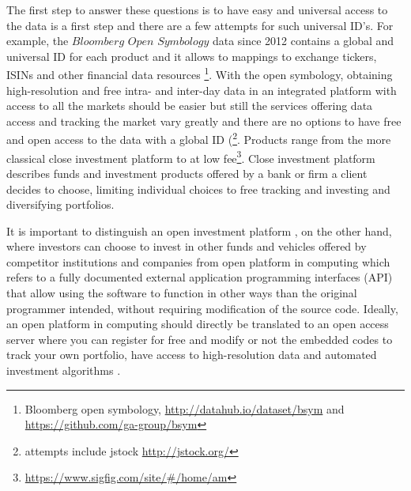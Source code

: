 \documentclass[english,12pt]{article}
\begin{document}
The first step to answer these questions is to have easy and universal access to the data is a first step and there are a few attempts for such universal ID's. For example, the $Bloomberg$ $Open$ $Symbology$ data since 2012 contains a global and universal ID for each product and it allows to mappings to exchange tickers, ISINs and other financial data resources \footnote{Bloomberg open symbology, \url{http://datahub.io/dataset/bsym} and \url{https://github.com/ga-group/bsym}}. With the open symbology, obtaining high-resolution and free intra- and inter-day data in an integrated platform with access to all the markets should be easier but still the services offering data access and tracking the
market vary greatly and there are no options to have free and open access to the data with a global ID (\footnote{attempts include jstock \url{http://jstock.org/}}. Products range from the more classical close investment platform  to  at low fee\footnote{\url{https://www.sigfig.com/site/#/home/am}}. Close investment platform describes funds and investment products offered by a bank or firm a client decides to choose, limiting individual choices to free tracking and investing and diversifying portfolios. 

It is important to distinguish an open investment platform
, on the other hand, where investors
can choose to invest in other funds and vehicles offered by competitor
institutions and companies from open platform in computing 
which refers to a fully documented external application programming
interfaces (API) that allow using the software to function in other
ways than the original programmer intended, without requiring
modification of the source code. Ideally, an open platform in
computing should directly be translated to an open access server where
you can register for free and modify or not the embedded codes to
track your own portfolio, have access to high-resolution data 
and automated investment algorithms .
\end{document}
